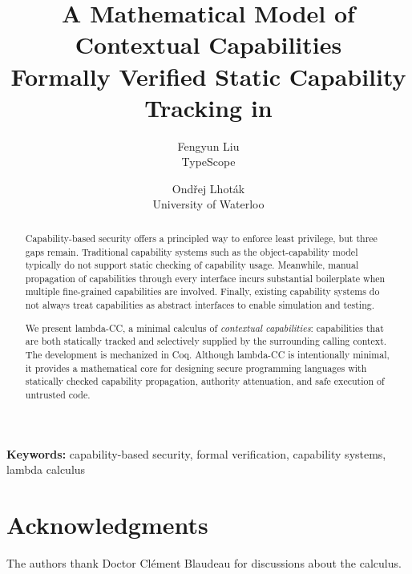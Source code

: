 \documentclass[11pt,a4paper]{article}
\title{\textbf{A Mathematical Model of Contextual Capabilities}\\[0.5em]
\large Formally Verified Static Capability Tracking in
\texorpdfstring{\lambdaCC}{lambda-CC}}
\author{Fengyun Liu\\TypeScope \and Ond\v{r}ej Lhot\'ak\\University of Waterloo}
\date{}
\def\lambdaCC{lambda-CC}%
\begin{document}
\maketitle

\begin{abstract}
  Capability-based security offers a principled way to enforce least privilege,
  but three gaps remain. %
  Traditional capability systems such as the object-capability model typically
  do not support static checking of capability usage. %
  Meanwhile, manual propagation of capabilities through every interface incurs
  substantial boilerplate when multiple fine-grained capabilities are
  involved. %
  Finally, existing capability systems do not always treat capabilities as
  abstract interfaces to enable simulation and testing. %

  We present \lambdaCC{}, a minimal calculus of \emph{contextual capabilities}:
  capabilities that are both statically tracked and selectively supplied by the
  surrounding calling context. %
  The development is mechanized in Coq. %
  Although \lambdaCC{} is intentionally minimal, it provides a mathematical core
  for designing secure programming languages with statically checked capability
  propagation, authority attenuation, and safe execution of untrusted code. %
\end{abstract}

\vspace{1em}
\noindent\textbf{Keywords:} capability-based security, formal verification,
capability systems, lambda calculus

\tableofcontents

\newpage










\section*{Acknowledgments}

The authors thank Doctor Cl\'ement Blaudeau for discussions about the calculus. %
\end{document}

